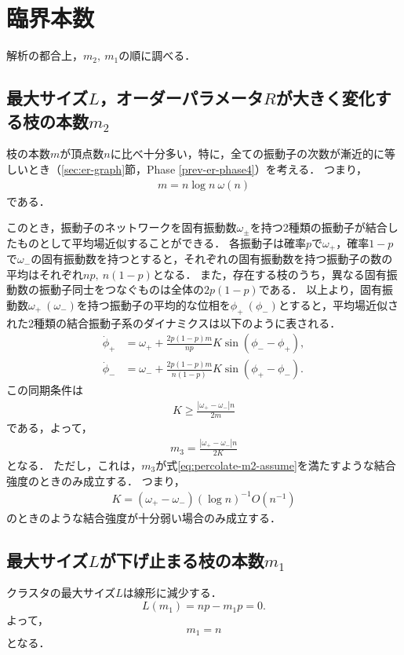 \documentclass[../main]{subfiles}
\begin{document}
\section{臨界本数}
\label{sec:percolate-m}
解析の都合上，$m_2,\ m_1$の順に調べる．
\subsection{最大サイズ$L$，オーダーパラメータ$R$が大きく変化する枝の本数$m_2$}
枝の本数$m$が頂点数$n$に比べ十分多い，特に，全ての振動子の次数が漸近的に等しいとき（\ref{sec:er-graph}節，Phase \ref{prev-er-phase4}）を考える．
つまり，
\begin{align}
    \label{eq:percolate-m2-assume}
    m= n\log n\ \omega(n)
\end{align}
である．

このとき，振動子のネットワークを固有振動数$\omega_\pm$を持つ2種類の振動子が結合したものとして平均場近似することができる．
各振動子は確率$p$で$\omega_+$，確率$1-p$で$\omega_-$の固有振動数を持つとすると，それぞれの固有振動数を持つ振動子の数の平均はそれぞれ$np,\ n(1-p)$となる．
また，存在する枝のうち，異なる固有振動数の振動子同士をつなぐものは全体の$2p(1-p)$である．
以上より，固有振動数$\omega_+\ (\omega_-)$を持つ振動子の平均的な位相を$\phi_+\ (\phi_-)$とすると，平均場近似された2種類の結合振動子系のダイナミクスは以下のように表される．
\begin{align*}
    \dot{\phi}_+&=\omega_++\frac{2p(1-p)m}{np}K\sin(\phi_--\phi_+),\\
    \dot{\phi}_-&=\omega_-+\frac{2p(1-p)m}{n(1-p)}K\sin(\phi_+-\phi_-).
\end{align*}
この同期条件は
\begin{align*}
    K\geq \frac{|\omega_+-\omega_-|n}{2m}
\end{align*}
である，よって，
\begin{align}
    \label{eq:percolate-m3}
    m_3=\frac{|\omega_+-\omega_-|n}{2K}
\end{align}
となる．
ただし，これは，$m_3$が式\eqref{eq:percolate-m2-assume}を満たすような結合強度のときのみ成立する．
つまり，
\begin{align}
    \label{eq:er-meanfield-k}
    K=(\omega_+-\omega_-)(\log n)^{-1}O(n^{-1})
\end{align}
のときのような結合強度が十分弱い場合のみ成立する．
\subsection{最大サイズ$L$が下げ止まる枝の本数$m_1$}
\label{sec:percolate-m1}
クラスタの最大サイズ$L$は線形に減少する．
\[L(m_1)=np-m_1p=0.\]
よって，
\[m_1=n\]
となる．
\end{document}
